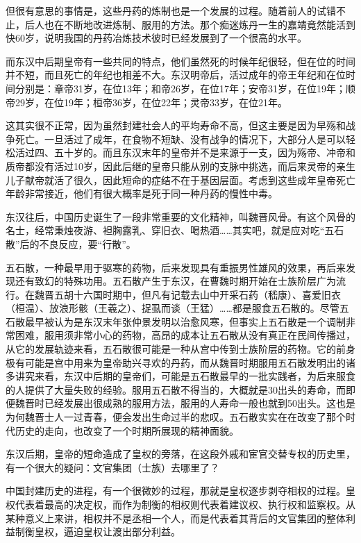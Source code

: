 \documentclass[
]{book}
\begin{document}
但很有意思的事情是，这些丹药的炼制也是一个发展的过程。随着前人的试错不止，后人也在不断地改进炼制、服用的方法。那个痴迷炼丹一生的嘉靖竟然能活到快60岁，说明我国的丹药冶炼技术彼时已经发展到了一个很高的水平。

而东汉中后期皇帝有一些共同的特点，他们虽然死的时候年纪很轻，但在位的时间并不短，而且死亡的年纪也相差不大。东汉明帝后，活过成年的帝王年纪和在位时间分别是：章帝31岁，在位13年；和帝26岁，在位17年；安帝31岁，在位19年；顺帝29岁，在位19年；桓帝36岁，在位22年；灵帝33岁，在位21年。

这其实很不正常，因为虽然封建社会人的平均寿命不高，但这主要是因为早殇和战争死亡。一旦活过了成年，在食物不短缺、没有战争的情况下，大部分人是可以轻松活过四、五十岁的。而且东汉末年的皇帝并不是来源于一支，因为殇帝、冲帝和质帝都没有活过10岁，因此后继的皇帝只能从别的支脉中挑选，而后来灵帝的亲生儿子献帝就活了很久，因此短命的症结不在于基因层面。考虑到这些成年皇帝死亡年龄非常接近，他们有很大概率是死于同一种丹药的慢性中毒。

东汉往后，中国历史诞生了一段非常重要的文化精神，叫魏晋风骨。有这个风骨的名士，经常秉烛夜游、袒胸露乳、穿旧衣、喝热酒\ldots\ldots 其实吧，就是应对吃``五石散''后的不良反应，要``行散''。

五石散，一种最早用于驱寒的药物，后来发现具有重振男性雄风的效果，再后来发现还有致幻的特殊功用。五石散产生于东汉，在曹魏时期开始在士族阶层广为流行。在魏晋五胡十六国时期中，但凡有记载去山中开采石药（嵇康）、喜爱旧衣（桓温）、放浪形骸（王羲之）、捉虱而谈（王猛）\ldots\ldots 都是服食五石散的。尽管五石散最早被认为是东汉末年张仲景发明以治愈风寒，但事实上五石散是一个调制非常困难，服用须非常小心的药物，高昂的成本让五石散从没有真正在民间传播过，从它的发展轨迹来看，五石散很可能是一种从宫中传到士族阶层的药物。它的前身极有可能是宫中用来为皇帝助兴寻欢的丹药，而从魏晋时期服用五石散发明出的诸多讲究来看，东汉中后期的皇帝们，可能是五石散最早的一批实践者，为后来服食的人提供了大量失败的经验。服用五石散不得当的，大概就是30出头的寿命，而即便魏晋时已经发展出很成熟的服用方法，服用的人寿命一般也就到50出头。这也是为何魏晋士人一过青春，便会发出生命过半的悲叹。五石散实实在在改变了那个时代历史的走向，也改变了一个时期所展现的精神面貌。

东汉后期，皇帝的短命造成了皇权的旁落，在这段外戚和宦官交替专权的历史里，有一个很大的疑问：文官集团（士族）去哪里了？

中国封建历史的进程，有一个很微妙的过程，那就是皇权逐步剥夺相权的过程。皇权代表着最高的决定权，而作为制衡的相权则代表着建议权、执行权和监察权。从某种意义上来讲，相权并不是丞相一个人，而是代表着其背后的文官集团的整体利益制衡皇权，逼迫皇权让渡出部分利益。
\end{document}
